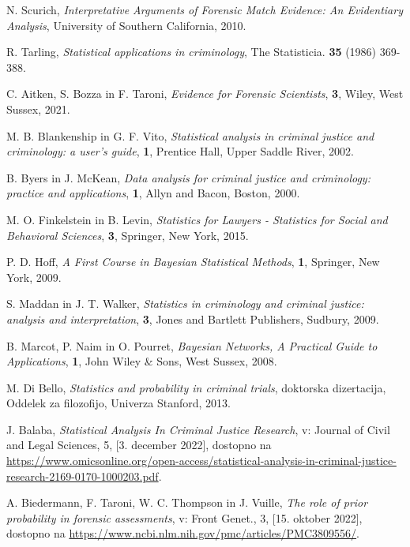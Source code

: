 \documentclass[12pt,a4paper]{amsart}
\theoremstyle{definition} %
\theoremstyle{plain} %
\begin{document}
\begin{thebibliography}{99}
        N. Scurich, \emph{Interpretative Arguments of Forensic Match Evidence: An Evidentiary Analysis}, University of Southern California, 2010.

        R. Tarling, \emph{Statistical applications in criminology}, The Statisticia. \textbf{35} (1986) 369-388.

        C. Aitken, S. Bozza in F. Taroni, \emph{Evidence for Forensic Scientists}, \textbf{3}, Wiley, West Sussex, 2021.

        M. B. Blankenship in G. F. Vito, \emph{Statistical analysis in criminal justice and criminology: a user's guide}, \textbf{1}, Prentice Hall, Upper Saddle River, 2002.

        B. Byers in J. McKean, \emph{Data analysis for criminal justice and criminology: practice and applications}, \textbf{1}, Allyn and Bacon, Boston, 2000.

        M. O. Finkelstein in B. Levin, \emph{Statistics for Lawyers - Statistics for Social and Behavioral Sciences}, \textbf{3}, Springer, New York, 2015.

        P. D. Hoff, \emph{A First Course in Bayesian Statistical Methods}, \textbf{1}, Springer, New York, 2009.

        S. Maddan in J. T. Walker, \emph{Statistics in criminology and criminal justice: analysis and interpretation}, \textbf{3}, Jones and Bartlett Publishers, Sudbury, 2009.

        B. Marcot, P. Naim in O. Pourret, \emph{Bayesian Networks, A Practical Guide to Applications}, \textbf{1}, John Wiley \& Sons, West Sussex, 2008.

        M. Di Bello, \emph{Statistics and probability in criminal trials}, doktorska dizertacija, Oddelek za filozofijo, Univerza Stanford, 2013.

        J. Balaba, \emph{Statistical Analysis In Criminal Justice Research}, v: Journal of Civil and Legal Sciences, 5, [3. december 2022], dostopno na \url{https://www.omicsonline.org/open-access/statistical-analysis-in-criminal-justice-research-2169-0170-1000203.pdf}.

        A. Biedermann, F. Taroni, W. C. Thompson in J. Vuille, \emph{The role of prior probability in forensic assessments}, v: Front Genet., 3, [15. oktober 2022], dostopno na \url{https://www.ncbi.nlm.nih.gov/pmc/articles/PMC3809556/}.


\end{thebibliography}
\end{document}
